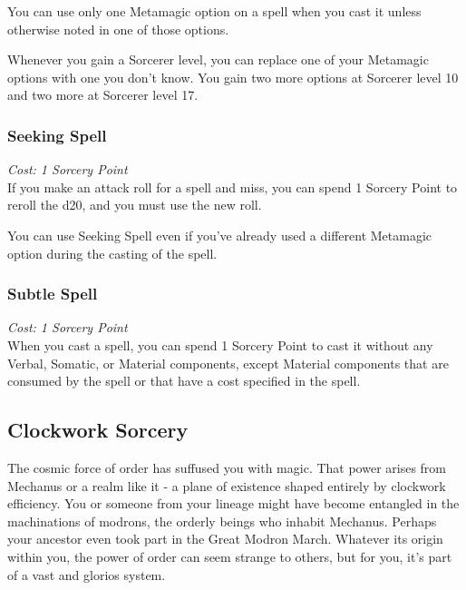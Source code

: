 \documentclass[letterpaper,openany,oneside,twocolumn]{book}
\begin{document}
You can use only one Metamagic option on a spell when you cast it unless otherwise noted in one of those options.

Whenever you gain a Sorcerer level, you can replace one of your Metamagic options with one you don't know. You gain two more options at Sorcerer level 10 and two more at Sorcerer level 17.
\subsubsection*{Seeking Spell}
\textit{Cost: 1 Sorcery Point}\\
If you make an attack roll for a spell and miss, you can spend 1 Sorcery Point to reroll the d20, and you must use the new roll.

You can use Seeking Spell even if you've already used a different Metamagic option during the casting of the spell.
\subsubsection*{Subtle Spell}
\textit{Cost: 1 Sorcery Point}\\
When you cast a spell, you can spend 1 Sorcery Point to cast it without any Verbal, Somatic, or Material components, except Material components that are consumed by the spell or that have a cost specified in the spell.

\subsection*{Clockwork Sorcery}
The cosmic force of order has suffused you with magic. That power arises from Mechanus or a realm like it - a plane of existence shaped entirely by clockwork efficiency. You or someone from your lineage might have become entangled in the machinations of modrons, the orderly beings who inhabit Mechanus. Perhaps your ancestor even took part in the Great Modron March. Whatever its origin within you, the power of order can seem strange to others, but for you, it's part of a vast and glorios system.
\end{document}
